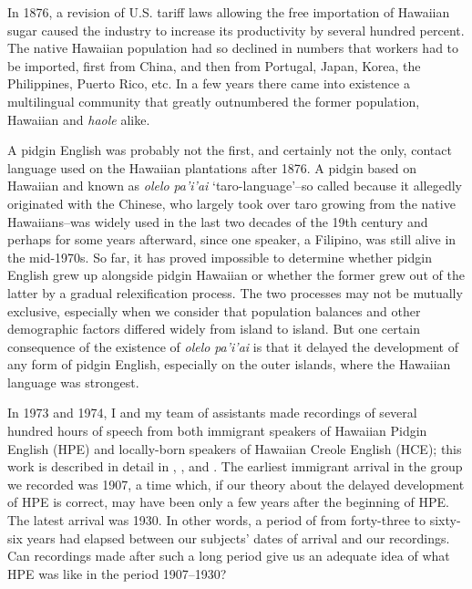 In 1876, a revision of U.S. tariff laws allowing the free importa\-tion of Hawaiian sugar caused the industry to increase its productivity by several hundred percent. The native Hawaiian population had so declined in numbers that workers had to be imported, first from China, and then from Portugal, Japan, Korea, the Philippines, Puerto Rico, etc. In a few years there came into existence a multilingual community that greatly outnumbered the former population, Hawaiian and \textit{haole} alike.

A pidgin English was probably not the first, and certainly not the only, contact language used on the Hawaiian plantations after 1876. A pidgin based on Hawaiian and known as \textit{olelo} \textit{pa'i'ai} `taro-language'--so called because it allegedly originated with the Chinese, who largely took over taro growing from the native Hawaiians--was widely used in the last two decades of the 19th century \citep[307--308]{Bickerton1977} and perhaps for some years afterward, since one speaker, a Filipino, was still alive in the mid-1970s. So far, it has proved impos\-sible to determine whether pidgin English grew up alongside pidgin Hawaiian or whether the former grew out of the latter by a gradual relexification process. The two processes may not be mutually exclu\-sive, especially when we consider that population balances and other demographic factors differed widely from island to island. But one certain consequence of the existence of \textit{olelo} \textit{pa'i'ai} is that it delayed the development of any form of pidgin English, especially on the outer islands, where the Hawaiian language was strongest.

In 1973 and 1974, I and my team of assistants made recordings
of several hundred hours of speech from both immigrant speakers of Hawaiian Pidgin English (HPE) and locally-born speakers of Hawaiian Creole English (HCE); this work is described in detail in \citet{BickertonEtAl1976}, \citet{BickertonEtAl1976b}, and \citet{Bickerton1977}. The earliest immigrant arrival in the group we recorded was 1907, a time which, if our theory about the delayed development of HPE is correct, may have been only a few years after the beginning of HPE. The latest arrival was 1930. In other words, a period of from forty-three to sixty-six years had elapsed between our subjects' dates of arrival and our recordings. Can recordings made after such a long period give us an adequate idea of what HPE was like in the period 1907--1930?


